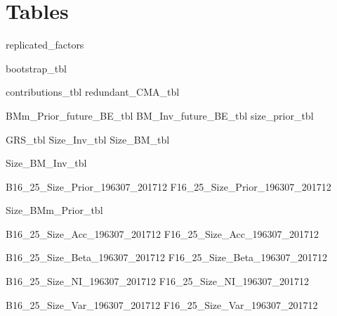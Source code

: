 
\section{Tables} \label{sec:tables}


{replicated_factors}

\begin{landscape}
{bootstrap_tbl}
\end{landscape}
{contributions_tbl}
{redundant_CMA_tbl}

{BMm_Prior_future_BE_tbl}
{BM_Inv_future_BE_tbl}
{size_prior_tbl}

{GRS_tbl}
{Size_Inv_tbl}
{Size_BM_tbl}
\begin{landscape}
{Size_BM_Inv_tbl}
\end{landscape}

{B16_25_Size_Prior_196307_201712}
{F16_25_Size_Prior_196307_201712}

\begin{landscape}
{Size_BMm_Prior_tbl}
\end{landscape}

{B16_25_Size_Acc_196307_201712}
{F16_25_Size_Acc_196307_201712}

{B16_25_Size_Beta_196307_201712}
{F16_25_Size_Beta_196307_201712}

{B16_25_Size_NI_196307_201712}
{F16_25_Size_NI_196307_201712}

{B16_25_Size_Var_196307_201712}
{F16_25_Size_Var_196307_201712}

